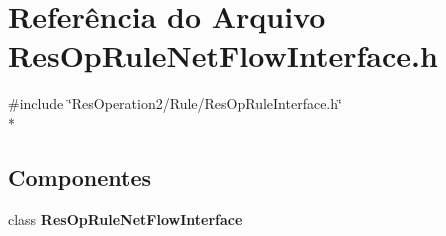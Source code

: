 \section{Referência do Arquivo Res\+Op\+Rule\+Net\+Flow\+Interface.\+h}
\label{_res_op_rule_net_flow_interface_8h}
{\ttfamily \#include \char`\"{}Res\+Operation2/\+Rule/\+Res\+Op\+Rule\+Interface.\+h\char`\"{}}\\*
\subsection*{Componentes}
\begin{DoxyCompactItemize}
\item 
class {\bf Res\+Op\+Rule\+Net\+Flow\+Interface}
\end{DoxyCompactItemize}
